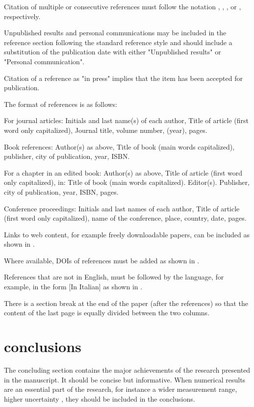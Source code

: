 \documentclass[final]{imeko_acta}
\begin{document}
Citation of multiple or consecutive references must follow the notation \cite{Fazio1995}, \cite{Middelhoek1989}, 
\cite{Lighthill1950}, or \cite{Fazio1995,Middelhoek1989,Grattan1994}, respectively.

Unpublished results and personal communications may be included in the reference section following the standard reference style and should include a substitution of the publication date with either "Unpublished results" or "Personal communication". 

Citation of a reference as "in press" implies that the item has been accepted for publication.

The format of references is as follows:

\begin{enumerate-a}
	\item For journal articles: Initials and last name(s) of each author, Title of article (first word only capitalized), Journal title, volume number, (year), pages.
	\item Book references: Author(s) as above, Title of book (main words capitalized), publisher, city of publication, year, ISBN. 
	\item For a chapter in an edited book: Author(s) as above, Title of article (first word only capitalized), in: Title of book (main words capitalized). Editor(s). Publisher, city of publication, year, ISBN, pages.
	\item Conference proceedings: Initials and last names of each author, Title of article (first word only capitalized), name of the conference, place, country, date, pages.
	\item Links to web content, for example freely downloadable papers, can be included as shown in \cite{cruz2008}.
	\item Where available, DOIs of references must be added as shown in \cite{Fazio1995}.
	\item References that are not in English, must be followed by
	the language, for example, in the form [In Italian] as
	shown in \cite{spallone2017}.
\end{enumerate-a}

There is a section break at the end of the paper (after the references) so that the content of the last page is equally divided between the two columns.

\section{conclusions}
The concluding section contains the major achievements of the research presented in the manuscript. It should be concise but informative. When numerical results are an essential part of the research, for instance a wider measurement range, higher uncertainty \cite{Pop2006}, they should be included in the conclusions.
\end{document}

